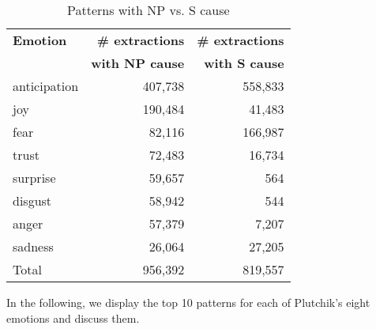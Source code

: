 \begin{table}[h]
\centering
\begin{tabular}{l|r|r}
{\bf Emotion} & {\bf \# extractions} & {\bf \# extractions} \\
{\bf }        & {\bf with NP cause}         & {\bf with S cause}          \\\hline
anticipation  & 407,738 & 558,833                \\
joy           & 190,484 & 41,483                 \\
fear          & 82,116 & 166,987                \\
trust         & 72,483 & 16,734                 \\
surprise      & 59,657 & 564                    \\
disgust       & 58,942 & 544                    \\
anger         & 57,379 & 7,207                  \\
sadness       & 26,064 & 27,205                 \\\hline
Total         & 956,392 &	819,557
\end{tabular}
\caption{Patterns with NP vs. S cause}
\label{tab:patterns-np-vs-s}
\end{table}

In the following, we display the top 10 patterns for each of Plutchik's eight emotions and discuss them.

